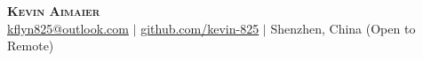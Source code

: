\begin{center}
    \textbf{\Huge \scshape Kevin Aimaier} \\ \vspace{1pt}
    \small \href{mailto:kflyn825@outlook.com}{kflyn825@outlook.com} $|$ 
    \href{https://github.com/kevin-825}{github.com/kevin-825} $|$
    \small Shenzhen, China (Open to Remote)
\end{center}